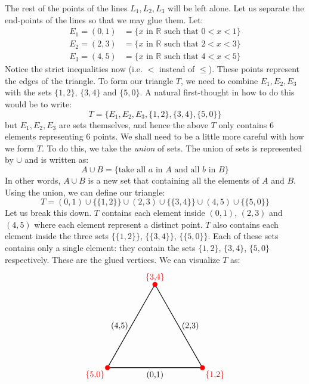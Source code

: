 \documentclass{article}
\newcommand{\R}{{\mathbb{R}}}
\begin{document}
The rest of the points of the lines $L_1, L_2, L_3$ will be left alone. Let us separate the end-points of the lines so that we may
glue them. Let:
\begin{align*}
  E_1 =(0,1) &= \{x\text{ in }\R\text{ such that $0< x < 1$}\}\\
  E_2 = (2,3) &= \{x\text{ in }\R\text{ such that $2< x < 3$}\}\\
  E_3 = (4,5) &= \{x\text{ in }\R\text{ such that $4< x < 5$}\}
\end{align*}
Notice the strict inequalities now (i.e. $<$ instead of $\le$). These points represent the edges of the
triangle. To form our triangle $T$, we need to combine $E_1, E_2, E_3$ with the sets $\{1,2\}$, $\{3,4\}$ and
$\{5,0\}$. A natural first-thought in how to do this would be to write:
\[
  T = \{E_1, E_2, E_3, \{1,2\}, \{3,4\}, \{5,0\}\}
\]
but $E_1, E_2, E_3$ are sets themselves, and hence the above $T$ only contains $6$ elements representing $6$
points. We shall need to be a little more careful with how we form $T$. To do this, we take the \emph{union}
of sets. The union of sets is represented by $\cup$ and is written as:
\[
  A\cup B = \{\text{take all $a$ in $A$ and all $b$ in $B$}\}
\]
In other words, $A\cup B$ is a new set that containing all the elements of $A$ and $B$. Using the union, we
can define our triangle:
\[
  T =(0,1) \cup \{\{1,2\}\}\cup (2,3)\cup \{\{3,4\}\}\cup (4,5)\cup \{\{5,0\}\}
\]
Let us break this down. $T$ contains each element inside $(0,1)$, $(2,3)$ and $(4,5)$ where each element
represent a distinct point. $T$ also contains
each element inside the three sets $\{\{1,2\}\}$, $\{\{3,4\}\}$, $\{\{5,0\}\}$. Each of these sets contains
only a single element: they contain the sets $\{1,2\}$, $\{3,4\}$, $\{5,0\}$ respectively. These are the glued vertices. We can visualize $T$ as:
\[
  \begin{tikzpicture}
  \coordinate (A) at (0,0);
  \coordinate (B) at (4,0);
  \coordinate (C) at (2,3.5);

  \draw[thick] (A) -- node[midway, below] {(0,1)} (B);
  \draw[thick] (B) -- node[midway, right] {(2,3)} (C);
  \draw[thick] (C) -- node[midway, left] {(4,5)} (A);

  \draw[red, fill=red] (A) circle (0.1) node[below left] {\{5,0\}};
  \draw[red, fill=red] (B) circle (0.1) node[below right] {\{1,2\}};
  \draw[red, fill=red] (C) circle (0.1) node[above] {\{3,4\}};
\end{tikzpicture}
\]
\end{document}

